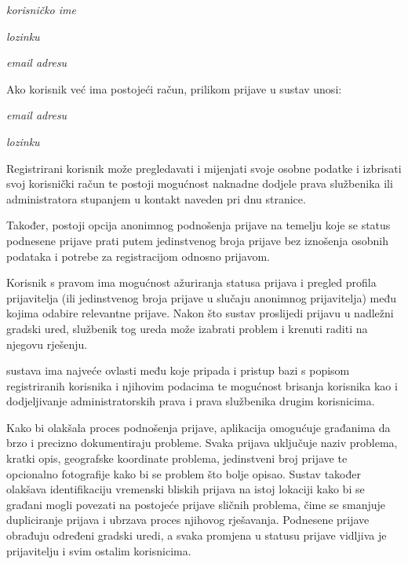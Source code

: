 \begin{packed_item}
	\item \textit{korisničko ime}
	\item \textit{lozinku}
	\item \textit{email adresu}
\end{packed_item}

\noindent Ako korisnik već ima postojeći račun, prilikom prijave u sustav unosi:

\begin{packed_item}
	\item \textit{email adresu}
	\item \textit{lozinku}
\end{packed_item}

\noindent Registrirani korisnik može pregledavati i mijenjati svoje osobne podatke i izbrisati svoj korisnički račun te postoji mogućnost naknadne dodjele prava službenika ili administratora stupanjem u kontakt naveden pri dnu stranice.

\noindent Također, postoji opcija anonimnog podnošenja prijave na temelju koje se status podnesene prijave prati putem jedinstvenog broja prijave bez iznošenja osobnih podataka i potrebe za registracijom odnosno prijavom.

Korisnik s pravom  ima mogućnost ažuriranja statusa prijava i pregled profila prijavitelja (ili jedinstvenog broja prijave u slučaju anonimnog prijavitelja) među kojima odabire relevantne prijave. Nakon što sustav proslijedi prijavu u nadležni gradski ured, službenik tog ureda može izabrati problem i krenuti raditi na njegovu rješenju.


 sustava ima najveće ovlasti među koje pripada i pristup bazi s popisom registriranih korisnika i njihovim podacima te mogućnost brisanja korisnika kao i dodjeljivanje administratorskih prava i prava službenika drugim korisnicima.

\noindent Kako bi olakšala proces podnošenja prijave, aplikacija omogućuje građanima da brzo i precizno dokumentiraju probleme. Svaka prijava uključuje naziv problema, kratki opis, geografske koordinate problema, jedinstveni broj prijave te opcionalno fotografije kako bi se problem što bolje opisao.
\noindent Sustav također olakšava identifikaciju vremenski bliskih prijava na istoj lokaciji kako bi se građani mogli povezati na postojeće prijave sličnih problema, čime se smanjuje dupliciranje prijava i ubrzava proces njihovog rješavanja.
\noindent Podnesene prijave obrađuju određeni gradski uredi, a svaka promjena u statusu prijave vidljiva je prijavitelju i svim ostalim korisnicima.


